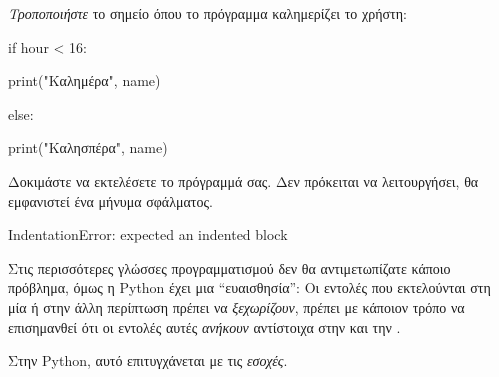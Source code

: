 \documentclass[a4paper,11pt,oneside]{book}
\begin{document}
\begin{step}
\emph{Τροποποιήστε} το σημείο όπου το πρόγραμμα καλημερίζει το χρήστη:

\begin{pynew}
if hour < 16:
\end{pynew}
\begin{pyplain}
print("Καλημέρα", name)
\end{pyplain}
\begin{pynew}
else:
\end{pynew}
\begin{pyplain}
print("Καλησπέρα", name)
\end{pyplain}

\marginnote[28pt]{\iconcaution}
Δοκιμάστε να εκτελέσετε το πρόγραμμά σας. Δεν πρόκειται να λειτουργήσει, θα εμφανιστεί ένα μήνυμα σφάλματος.

\begin{pyterm}
IndentationError: expected an indented block
\end{pyterm}

Στις περισσότερες γλώσσες προγραμματισμού δεν θα αντιμετωπίζατε κάποιο πρόβλημα, όμως η Python έχει μια ``ευαισθησία'': Οι εντολές που εκτελούνται στη μία ή στην άλλη περίπτωση πρέπει να \emph{ξεχωρίζουν}, πρέπει με κάποιον τρόπο να επισημανθεί ότι οι εντολές αυτές \emph{ανήκουν} αντίστοιχα στην  και την . 

Στην Python, αυτό επιτυγχάνεται με τις \emph{εσοχές}.
\end{step}
\end{document}

